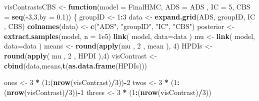 \documentclass[10pt,dvipsnames,enabledeprecatedfontcommands]{scrartcl}
\newenvironment{Shaded}{\begin{snugshade}}{\end{snugshade}}
\newcommand{\KeywordTok}[1]{\textcolor[rgb]{0.13,0.29,0.53}{\textbf{#1}}}
\newcommand{\DataTypeTok}[1]{\textcolor[rgb]{0.13,0.29,0.53}{#1}}
\newcommand{\DecValTok}[1]{\textcolor[rgb]{0.00,0.00,0.81}{#1}}
\newcommand{\FloatTok}[1]{\textcolor[rgb]{0.00,0.00,0.81}{#1}}
\newcommand{\StringTok}[1]{\textcolor[rgb]{0.31,0.60,0.02}{#1}}
\newcommand{\ControlFlowTok}[1]{\textcolor[rgb]{0.13,0.29,0.53}{\textbf{#1}}}
\newcommand{\OperatorTok}[1]{\textcolor[rgb]{0.81,0.36,0.00}{\textbf{#1}}}
\newcommand{\NormalTok}[1]{#1}
\begin{document}
\begin{Shaded}
\begin{Highlighting}[]
\NormalTok{visContrastsCBS <-}\StringTok{ }\ControlFlowTok{function}\NormalTok{(}\DataTypeTok{model =}\NormalTok{ FinalHMC, }\DataTypeTok{ADS =}\NormalTok{ ADS , }\DataTypeTok{IC =}  \DecValTok{5}\NormalTok{,}
                            \DataTypeTok{CBS =} \KeywordTok{seq}\NormalTok{(}\OperatorTok{-}\DecValTok{3}\NormalTok{,}\DecValTok{3}\NormalTok{,}\DataTypeTok{by  =} \FloatTok{0.1}\NormalTok{))}
\NormalTok{  \{}
\NormalTok{  groupID <-}\StringTok{ }\DecValTok{1}\OperatorTok{:}\DecValTok{3}
\NormalTok{  data <-}\StringTok{ }\KeywordTok{expand.grid}\NormalTok{(ADS, groupID, IC , CBS)}
  \KeywordTok{colnames}\NormalTok{(data) <-}\StringTok{ }\KeywordTok{c}\NormalTok{(}\StringTok{"ADS"}\NormalTok{, }\StringTok{"groupID"}\NormalTok{, }\StringTok{"IC"}\NormalTok{, }\StringTok{"CBS"}\NormalTok{)}
\NormalTok{  posterior <-}\StringTok{ }\KeywordTok{extract.samples}\NormalTok{(model, }\DataTypeTok{n =} \FloatTok{1e5}\NormalTok{)}
  \KeywordTok{link}\NormalTok{( model, }\DataTypeTok{data=}\NormalTok{data ) }
\NormalTok{  mu <-}\StringTok{ }\KeywordTok{link}\NormalTok{( model, }\DataTypeTok{data=}\NormalTok{data ) }
\NormalTok{  means <-}\StringTok{  }\KeywordTok{round}\NormalTok{(}\KeywordTok{apply}\NormalTok{(mu , }\DecValTok{2}\NormalTok{ , mean ), }\DecValTok{4}\NormalTok{)}
\NormalTok{  HPDIs <-}\StringTok{ }\KeywordTok{round}\NormalTok{(}\KeywordTok{apply}\NormalTok{( mu , }\DecValTok{2}\NormalTok{ , HPDI ),}\DecValTok{4}\NormalTok{)}
\NormalTok{  visContrast <-}\StringTok{ }\KeywordTok{cbind}\NormalTok{(data,means,}\KeywordTok{t}\NormalTok{(}\KeywordTok{as.data.frame}\NormalTok{(HPDIs)))}
  
\NormalTok{  ones <-}\StringTok{ }\DecValTok{3} \OperatorTok{*}\StringTok{ }\NormalTok{(}\DecValTok{1}\OperatorTok{:}\NormalTok{(}\KeywordTok{nrow}\NormalTok{(visContrast)}\OperatorTok{/}\DecValTok{3}\NormalTok{))}\OperatorTok{-}\DecValTok{2}
\NormalTok{  twos <-}\StringTok{ }\DecValTok{3} \OperatorTok{*}\StringTok{ }\NormalTok{(}\DecValTok{1}\OperatorTok{:}\NormalTok{(}\KeywordTok{nrow}\NormalTok{(visContrast)}\OperatorTok{/}\DecValTok{3}\NormalTok{))}\OperatorTok{-}\DecValTok{1}
\NormalTok{  threes <-}\StringTok{ }\DecValTok{3} \OperatorTok{*}\StringTok{ }\NormalTok{(}\DecValTok{1}\OperatorTok{:}\NormalTok{(}\KeywordTok{nrow}\NormalTok{(visContrast)}\OperatorTok{/}\DecValTok{3}\NormalTok{))}
  

\end{Highlighting}
\end{Shaded}
\end{document}
